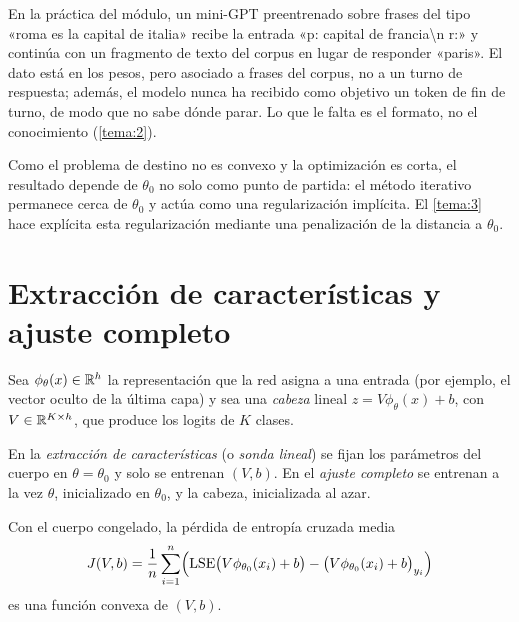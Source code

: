 \begin{ejemplo}\label{ej:base}
En la práctica del módulo, un mini-GPT preentrenado sobre frases del tipo «roma es la capital de italia» recibe la entrada «p: capital de francia\textbackslash n r:» y continúa con un fragmento de texto del corpus en lugar de responder «paris». El dato está en los pesos, pero asociado a frases del corpus, no a un turno de respuesta; además, el modelo nunca ha recibido como objetivo un token de fin de turno, de modo que no sabe dónde parar. Lo que le falta es el formato, no el conocimiento (\cref{tema:2}).
\end{ejemplo}

\begin{observacion}\label{obs:implicita}
Como el problema de destino no es convexo y la optimización es corta, el resultado depende de $\theta_0$ no solo como punto de partida: el método iterativo permanece cerca de $\theta_0$ y actúa como una regularización implícita. El \cref{tema:3} hace explícita esta regularización mediante una penalización de la distancia a $\theta_0$.
\end{observacion}

\section{Extracción de características y ajuste completo}

Sea $\phi_\theta(x)\in\mathbb{R}^{h}$ la representación que la red asigna a una entrada (por ejemplo, el vector oculto de la última capa) y sea una \emph{cabeza} lineal $z=V\phi_\theta(x)+b$, con $V\in\mathbb{R}^{K\times h}$, que produce los logits de $K$ clases.

\begin{definicion}\label{def:sonda}
En la \emph{extracción de características} (o \emph{sonda lineal}) se fijan los parámetros del cuerpo en $\theta=\theta_0$ y solo se entrenan $(V,b)$. En el \emph{ajuste completo} se entrenan a la vez $\theta$, inicializado en $\theta_0$, y la cabeza, inicializada al azar.
\end{definicion}

\begin{proposicion}\label{prop:sonda-convexa}
Con el cuerpo congelado, la pérdida de entropía cruzada media
\[
J(V,b)=\frac{1}{n}\sum_{i=1}^{n}\Bigl(\operatorname{LSE}\bigl(V\phi_{\theta_0}(x_i)+b\bigr)-\bigl(V\phi_{\theta_0}(x_i)+b\bigr)_{y_i}\Bigr)
\]
es una función convexa de $(V,b)$.
\end{proposicion}

